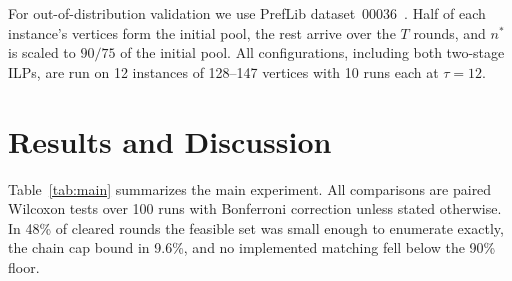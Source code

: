 \documentclass[journal]{IEEEtran}
\begin{document}
For out-of-distribution validation we use PrefLib
dataset~00036~\cite{mattei2013preflib}. Half of each instance's
vertices form the initial pool, the rest arrive over the $T$ rounds,
and $n^*$ is scaled to $90/75$ of the initial pool. All configurations, including both two-stage ILPs, are run on 12 instances
of 128--147 vertices with 10 runs each at $\tau = 12$.

\section{Results and Discussion}
\label{sec:results}

Table~\ref{tab:main} summarizes the main experiment. All comparisons
are paired Wilcoxon tests over 100 runs with Bonferroni correction
unless stated otherwise. In 48\% of cleared rounds the feasible set
was small enough to enumerate exactly, the chain cap bound in 9.6\%,
and no implemented matching fell below the 90\% floor.
\end{document}
